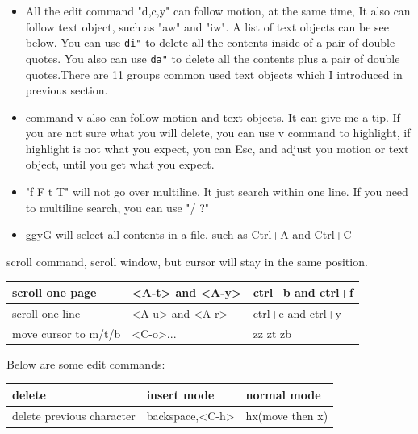 \documentclass[a4paper,12pt,twoside]{book}
\begin{document}
\begin{itemize}
\begin{center}
\begin{itemize}
				\item All the edit command "d,c,y" can follow motion, at the same time, It also can follow text object, such as "aw" and "iw". A list of text objects can be see below.  You can use \verb=di"= to delete all the contents inside of a pair of double quotes. You also can use \verb=da"= to delete all the contents plus a pair of double quotes.There are 11 groups common used text objects which I introduced in previous section. 
						
				\item command v also can follow motion and text objects. It can give me a tip. If you are not sure what you will delete, you can use v command to highlight, if highlight is not what you expect, you can Esc, and adjust you motion or text object, until you get what you expect. 

				\item "f F t T" will not go over multiline. It just search within one line. If you need to multiline search, you can use "/ ?"
								\item ggyG will select all contents in a file. such as Ctrl+A and Ctrl+C 
		\end{itemize}

 scroll command, scroll window, but cursor will stay in the same position.

 
 \begin{tabular}{p{}|p{}|p{}}
        \hline
        scroll one  page &  <A-t> and <A-y>  & ctrl+b and  ctrl+f    \\
        
        \hline 		  
        scroll one line &  <A-u> and <A-r>  & ctrl+e and ctrl+y \\
        
         \hline 		  
        move cursor to m/t/b & <C-o>...    & zz zt zb \\

    \end{tabular}
\end{center}
 
Below are some edit commands:
\begin{center}
		\begin{tabular}{p{}|p{}|p{}}
		\hline
		delete & insert mode & normal mode\\

   	    \hline 
		delete previous character & backspace,<C-h> & hx(move then x)  \\
		

\end{tabular}
\end{center}
\end{itemize}
\end{document}
